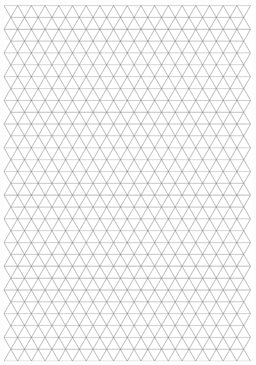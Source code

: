 \documentclass[10pt, portrait,letterpaper]{article}
\begin{document}
	\includegraphics[scale=.98]{triangle.0}

\label{LastPage}
\end{document}
